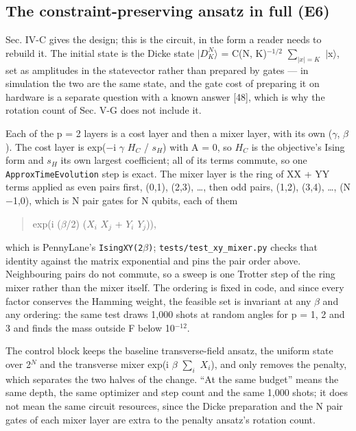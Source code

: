 \documentclass[journal]{IEEEtran}
\begin{document}
\subsection{The constraint-preserving ansatz in full (E6)}


Sec. IV-C gives the design; this is the circuit, in the form a reader needs to rebuild it. The initial state is the Dicke state $|$$D^{N}_{K}$$\rangle$ = C(N, K)$^{-1/2}$ $\sum_{|x| = K}$ $|$x$\rangle$, set as amplitudes in the statevector rather than prepared by gates --- in simulation the two are the same state, and the gate cost of preparing it on hardware is a separate question with a known answer [48], which is why the rotation count of Sec. V-G does not include it.


Each of the p = 2 layers is a cost layer and then a mixer layer, with its own ($\gamma$, $\beta$). The cost layer is exp($-$i $\gamma$ $H_{C}$ / $s_{H}$) with A = 0, so $H_{C}$ is the objective's Ising form and $s_{H}$ its own largest coefficient; all of its terms commute, so one \texttt{ApproxTimeEvolution} step is exact. The mixer layer is the ring of XX + YY terms applied as even pairs first, (0,1), (2,3), \ldots{}, then odd pairs, (1,2), (3,4), \ldots{}, (N$-$1,0), which is N pair gates for N qubits, each of them


\begin{quote}
exp(i ($\beta$/2) ($X_{i}$ $X_{j}$ + $Y_{i}$ $Y_{j}$)),
\end{quote}


which is PennyLane's \texttt{IsingXY(2$\beta$)}; \texttt{tests/test\_xy\_mixer.py} checks that identity against the matrix exponential and pins the pair order above. Neighbouring pairs do not commute, so a sweep is one Trotter step of the ring mixer rather than the mixer itself. The ordering is fixed in code, and since every factor conserves the Hamming weight, the feasible set is invariant at any $\beta$ and any ordering: the same test draws 1,000 shots at random angles for p = 1, 2 and 3 and finds the mass outside F below 10$^{-12}$.


The control block keeps the baseline transverse-field ansatz, the uniform state over 2$^{N}$ and the transverse mixer exp(i $\beta$ $\sum_{i}$ $X_{i}$), and only removes the penalty, which separates the two halves of the change. ``At the same budget'' means the same depth, the same optimizer and step count and the same 1,000 shots; it does not mean the same circuit resources, since the Dicke preparation and the N pair gates of each mixer layer are extra to the penalty ansatz's rotation count.
\end{document}
